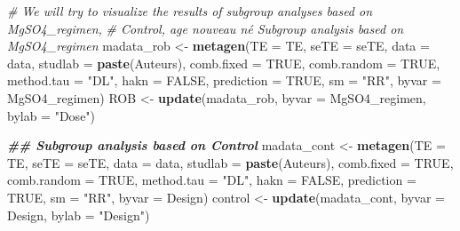 \documentclass[
]{article}
\newenvironment{Shaded}{\begin{snugshade}}{\end{snugshade}}
\newcommand{\AttributeTok}[1]{\textcolor[rgb]{0.13,0.29,0.53}{#1}}
\newcommand{\CommentTok}[1]{\textcolor[rgb]{0.56,0.35,0.01}{\textit{#1}}}
\newcommand{\ConstantTok}[1]{\textcolor[rgb]{0.56,0.35,0.01}{#1}}
\newcommand{\DocumentationTok}[1]{\textcolor[rgb]{0.56,0.35,0.01}{\textbf{\textit{#1}}}}
\newcommand{\FunctionTok}[1]{\textcolor[rgb]{0.13,0.29,0.53}{\textbf{#1}}}
\newcommand{\NormalTok}[1]{#1}
\newcommand{\OtherTok}[1]{\textcolor[rgb]{0.56,0.35,0.01}{#1}}
\newcommand{\StringTok}[1]{\textcolor[rgb]{0.31,0.60,0.02}{#1}}
\begin{document}
\begin{Shaded}
\begin{Highlighting}[]
\CommentTok{\# We will try to visualize the results of subgroup analyses based on \textquotesingle{}MgSO4\_regimen\textquotesingle{},}
\CommentTok{\# \textquotesingle{}Control\textquotesingle{}, \textquotesingle{}age nouveau né\textquotesingle{} Subgroup analysis based on \textquotesingle{}MgSO4\_regimen\textquotesingle{}}
\NormalTok{madata\_rob }\OtherTok{\textless{}{-}} \FunctionTok{metagen}\NormalTok{(}\AttributeTok{TE =}\NormalTok{ TE, }\AttributeTok{seTE =}\NormalTok{ seTE, }\AttributeTok{data =}\NormalTok{ data, }\AttributeTok{studlab =} \FunctionTok{paste}\NormalTok{(Auteurs), }
    \AttributeTok{comb.fixed =} \ConstantTok{TRUE}\NormalTok{, }\AttributeTok{comb.random =} \ConstantTok{TRUE}\NormalTok{, }\AttributeTok{method.tau =} \StringTok{"DL"}\NormalTok{, }\AttributeTok{hakn =} \ConstantTok{FALSE}\NormalTok{, }\AttributeTok{prediction =} \ConstantTok{TRUE}\NormalTok{, }
    \AttributeTok{sm =} \StringTok{"RR"}\NormalTok{, }\AttributeTok{byvar =}\NormalTok{ MgSO4\_regimen)}
\NormalTok{ROB }\OtherTok{\textless{}{-}} \FunctionTok{update}\NormalTok{(madata\_rob, }\AttributeTok{byvar =}\NormalTok{ MgSO4\_regimen, }\AttributeTok{bylab =} \StringTok{"Dose"}\NormalTok{)}


\DocumentationTok{\#\# Subgroup analysis based on \textquotesingle{}Control\textquotesingle{}}
\NormalTok{madata\_cont }\OtherTok{\textless{}{-}} \FunctionTok{metagen}\NormalTok{(}\AttributeTok{TE =}\NormalTok{ TE, }\AttributeTok{seTE =}\NormalTok{ seTE, }\AttributeTok{data =}\NormalTok{ data, }\AttributeTok{studlab =} \FunctionTok{paste}\NormalTok{(Auteurs), }
    \AttributeTok{comb.fixed =} \ConstantTok{TRUE}\NormalTok{, }\AttributeTok{comb.random =} \ConstantTok{TRUE}\NormalTok{, }\AttributeTok{method.tau =} \StringTok{"DL"}\NormalTok{, }\AttributeTok{hakn =} \ConstantTok{FALSE}\NormalTok{, }\AttributeTok{prediction =} \ConstantTok{TRUE}\NormalTok{, }
    \AttributeTok{sm =} \StringTok{"RR"}\NormalTok{, }\AttributeTok{byvar =}\NormalTok{ Design)}
\NormalTok{control }\OtherTok{\textless{}{-}} \FunctionTok{update}\NormalTok{(madata\_cont, }\AttributeTok{byvar =}\NormalTok{ Design, }\AttributeTok{bylab =} \StringTok{"Design"}\NormalTok{)}


\end{Highlighting}
\end{Shaded}
\end{document}
